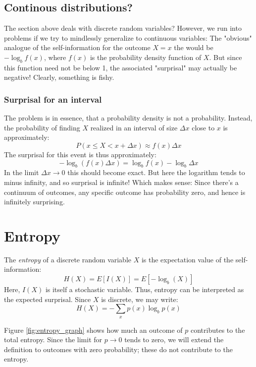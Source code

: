 \documentclass[12pt, a4paper]{article}
\numberwithin{equation}{section}
\begin{document}
\subsection{Continous distributions?}
The section above deals with discrete random variables? However, we run into problems if we try to mindlessly generalize to continuous variables: The "obvious" analogue of the self-information for the outcome $X=x$ the would be $-\log_b f(x)$, where $f(x)$ is the probability density function of $X$. But since this function need not be below 1, the associated "surprisal" may actually be negative! Clearly, something is fishy.

\subsubsection{Surprisal for an interval}
The problem is in essence, that a probability density is not a probability. Instead, the probability of finding $X$ realized in an interval of size $\Delta x$ close to $x$ is approximately:
\begin{equation}
P(x\le X<x+\Delta x)\approx f(x)\Delta x
\end{equation}
The surprisal for this event is thus approximately:
\begin{equation}
-\log_b(f(x)\Delta x)=\log_b f(x)-\log_b\Delta x
\end{equation}
In the limit $\Delta x\rightarrow 0$ this should become exact. But here the logarithm tends to minus infinity, and so surprisal is infinite! Which makes sense: Since there's a continuum of outcomes, any specific outcome has probability zero, and hence is infinitely surprising.


\section{Entropy}
The \textit{entropy} of a discrete random variable $X$ is the expectation value of the self-information:
\begin{equation}
H(X)=E[I(X)]=E[-\log_b(X)]
\end{equation}
Here, $I(X)$ is itself a stochastic variable. Thus, entropy can be interpreted as the expected surprisal. Since $X$ is discrete, we may write:
\begin{equation}
\label{entropy_definition}
H(X)=-\sum_x p(x)\log_b p(x)
\end{equation}

Figure \ref{fig:entropy_graph} shows how much an outcome of $p$ contributes to the total entropy. Since the limit for $p\rightarrow 0$ tends to zero, we will extend the definition to outcomes with zero probability; these do not contribute to the entropy.
\end{document}
